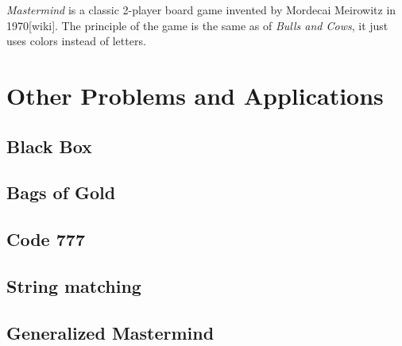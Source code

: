 \emph{Mastermind} is a classic 2-player board game invented by Mordecai Meirowitz in 1970[wiki].
The principle of the game is the same as of \emph{Bulls and Cows}, it just uses colors instead of letters.

\section{Other Problems and Applications}
\subsection{Black Box}
\subsection{Bags of Gold}

\subsection{Code 777}

\subsection{String matching}

\subsection{Generalized Mastermind}


